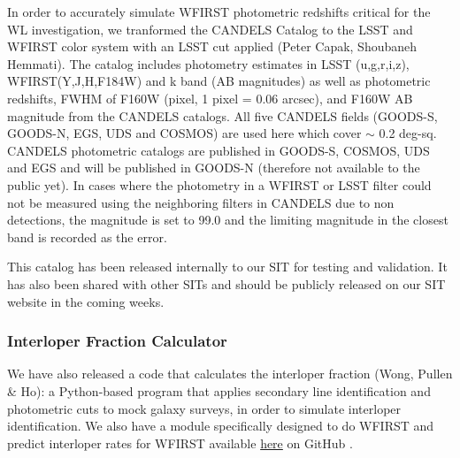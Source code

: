 In order to accurately simulate WFIRST photometric redshifts critical for the WL investigation, we tranformed the CANDELS Catalog to the LSST and WFIRST color system with an LSST cut applied (Peter Capak, Shoubaneh Hemmati). The catalog includes photometry estimates in LSST (u,g,r,i,z), WFIRST(Y,J,H,F184W) and k band (AB magnitudes) as well as photometric redshifts, FWHM of F160W (pixel, 1 pixel = 0.06 arcsec), and F160W AB magnitude from the CANDELS catalogs. All five CANDELS fields (GOODS-S, GOODS-N, EGS, UDS and COSMOS) are used here which cover $\sim$ 0.2 deg-sq. CANDELS photometric catalogs are published in GOODS-S, COSMOS, UDS and EGS and will be published in GOODS-N (therefore not available to the public yet). In cases where the photometry in a WFIRST or LSST filter could not be measured using the neighboring filters in CANDELS due to non detections, the magnitude is set to 99.0 and the limiting magnitude in the closest band is recorded as the error.

This catalog has been released internally to our SIT for testing and validation. It has also been shared with other SITs and should be publicly released on our SIT website in the coming weeks.

\subsubsection{Interloper Fraction Calculator}

 We have also released a code that calculates the interloper fraction (Wong, Pullen \& Ho): a Python-based program that applies secondary line identification and photometric cuts to mock galaxy surveys, in order to simulate interloper identification.  We also have a module specifically designed to do WFIRST and predict interloper rates for WFIRST available  \href{https://github.com/kazewong/Intercut}{here} on GitHub \citep{Wong:2016eku}.
